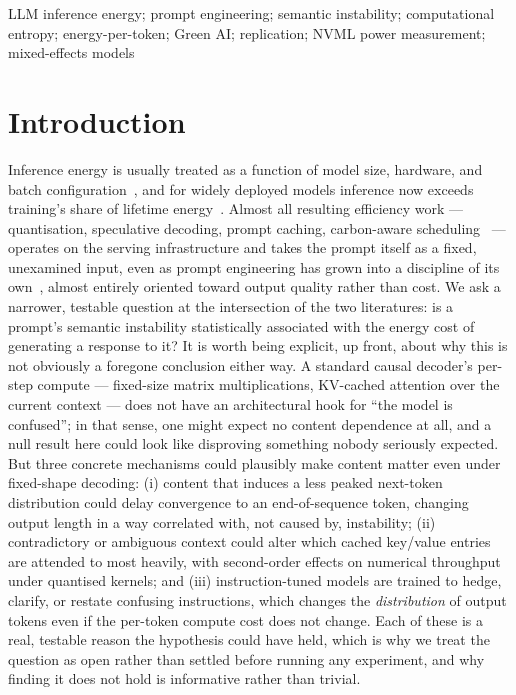 \documentclass[conference]{IEEEtran}
\begin{document}
\begin{IEEEkeywords}
LLM inference energy; prompt engineering; semantic instability;
computational entropy; energy-per-token; Green AI; replication;
NVML power measurement; mixed-effects models
\end{IEEEkeywords}
\section{Introduction}
Inference energy is usually treated as a function of model size,
hardware, and batch configuration~\cite{strubell2019energy,
patterson2022carbon,samsi2023words,desislavov2023trends}, and for
widely deployed models inference now exceeds training's share of
lifetime energy~\cite{wu2022sustainable,faiz2024llmcarbon}. Almost all
resulting efficiency work --- quantisation, speculative decoding,
prompt caching, carbon-aware scheduling~\cite{chien2023reducing,
dodge2022measuring} --- operates on the serving infrastructure and
takes the prompt itself as a fixed, unexamined input, even as prompt
engineering has grown into a discipline of its
own~\cite{sahoo2024systematic}, almost entirely oriented toward output
quality rather than cost. We ask a narrower, testable question at the
intersection of the two literatures: is a prompt's semantic
instability statistically associated with the energy cost of
generating a response to it?
It is worth being explicit, up front, about why this is not obviously
a foregone conclusion either way. A standard causal decoder's per-step
compute --- fixed-size matrix multiplications, KV-cached attention over
the current context --- does not have an architectural hook for ``the
model is confused''; in that sense, one might expect no content
dependence at all, and a null result here could look like disproving
something nobody seriously expected. But three concrete mechanisms
could plausibly make content matter even under fixed-shape decoding:
(i) content that induces a less peaked next-token distribution could
delay convergence to an end-of-sequence token, changing output length
in a way correlated with, not caused by, instability; (ii) contradictory
or ambiguous context could alter which cached key/value entries are
attended to most heavily, with second-order effects on numerical
throughput under quantised kernels; and (iii) instruction-tuned models
are trained to hedge, clarify, or restate confusing instructions,
which changes the \emph{distribution} of output tokens even if the
per-token compute cost does not change. Each of these is a real,
testable reason the hypothesis could have held, which is why we treat
the question as open rather than settled before running any
experiment, and why finding it does not hold is informative rather
than trivial.
\end{document}
